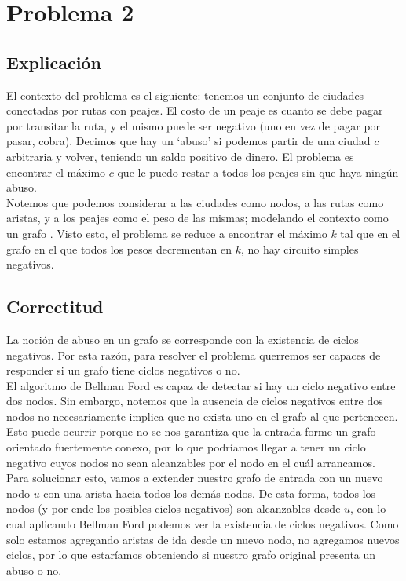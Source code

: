 
\section{Problema 2}

\subsection{Explicación}

El contexto del problema es el siguiente: tenemos un conjunto de ciudades conectadas por rutas con peajes. El costo de un peaje es cuanto se debe pagar por transitar la ruta, y el mismo puede ser negativo (uno en vez de pagar por pasar, cobra). Decimos que hay un `abuso' si podemos partir de una ciudad $c$ arbitraria y volver, teniendo un saldo positivo de dinero. El problema es encontrar el máximo $c$ que le puedo restar a todos los peajes sin que haya ningún abuso. \\

Notemos que podemos considerar a las ciudades como nodos, a las rutas como aristas, y a los peajes como el peso de las mismas; modelando el contexto como un grafo . Visto esto, el problema se reduce a encontrar el máximo $k$ tal que en el grafo en el que todos los pesos decrementan en $k$, no hay circuito simples negativos. \\

\subsection{Correctitud}

La noción de abuso en un grafo se corresponde con la existencia de ciclos negativos. Por esta razón, para resolver el problema querremos ser capaces de responder si un grafo tiene ciclos negativos o no. \\

El algoritmo de Bellman Ford es capaz de detectar si hay un ciclo negativo entre dos nodos. Sin embargo, notemos que la ausencia de ciclos negativos entre dos nodos no necesariamente implica que no exista uno en el grafo al que pertenecen. Esto puede ocurrir porque no se nos garantiza que la entrada forme un grafo orientado fuertemente conexo, por lo que podríamos llegar a tener un ciclo negativo cuyos nodos no sean alcanzables por el nodo en el cuál arrancamos. \\

Para solucionar esto, vamos a extender nuestro grafo de entrada con un nuevo nodo $u$ con una arista hacia todos los demás nodos. De esta forma, todos los nodos (y por ende los posibles ciclos negativos) son alcanzables desde $u$, con lo cual aplicando Bellman Ford podemos ver la existencia de ciclos negativos. Como solo estamos agregando aristas de ida desde un nuevo nodo, no agregamos nuevos ciclos, por lo que estaríamos obteniendo si nuestro grafo original presenta un abuso o no. \\

